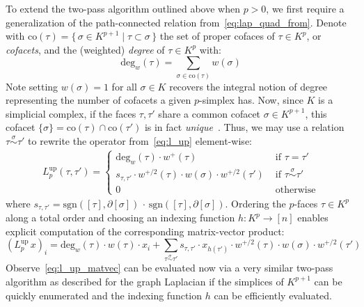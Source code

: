 \documentclass[10pt]{article}
\numberwithin{equation}{section}
\newcommand{\+}{%
	\raisebox{0.18ex}{\scaleobj{0.55}{+}}
}
\theoremstyle{definition}
\theoremstyle{definition}
\begin{document}
To extend the two-pass algorithm outlined above when $p > 0$, we first require a generalization of the path-connected relation from~\eqref{eq:lap_quad_from}.
 Denote with $\mathrm{co}(\tau) = \{ \, \sigma \in K^{p+1} \mid \tau \subset \sigma \, \}$ the set of proper cofaces of $\tau \in K^p$, or \emph{cofacets}, and the (weighted) \emph{degree} of $\tau \in K^p$ with: 
$$\mathrm{deg}_w(\tau) = \sum_{\sigma \in \mathrm{co}(\tau)} w(\sigma) $$
Note setting $w(\sigma) = 1$ for all $\sigma \in K$ recovers the integral notion of degree representing the number of cofacets a given $p$-simplex has. 
Now, since $K$ is a simplicial complex, if the faces $\tau, \tau'$ share a common cofacet $\sigma \in K^{p+1}$, this cofacet $\{\sigma\} = \mathrm{co}(\tau) \cap \mathrm{co}(\tau')$ is in fact \emph{unique}~\cite{goldberg2002combinatorial}. 
Thus, we may use a relation $\tau \overset{\sigma}{\sim} \tau'$ to rewrite the operator from~\eqref{eq:l_up} element-wise: 
\begin{align}\label{eq:up_laplace_theory}
	 L_p^{\text{up}}(\tau, \tau')= \begin{cases}
		 \mathrm{deg}_w(\tau) \cdot w^{+}(\tau) & \text{ if } \tau = \tau' \\ 
		s_{\tau, \tau'} \cdot  w^{+/2}(\tau) \cdot w(\sigma) \cdot w^{+/2}(\tau') & \text{ if } \tau \overset{\sigma}{\sim} \tau' \\
		0 & \text{ otherwise} 
	\end{cases}
\end{align}
where $s_{\tau, \tau'} = \mathrm{sgn}([\tau], \partial[\sigma]) \, \cdot \, \mathrm{sgn}([\tau], \partial[\sigma])$. Ordering the $p$-faces $\tau \in K^p$ along a total order and choosing an indexing function $h : K^p \to [n]$ enables explicit computation of the corresponding matrix-vector product: 
\begin{equation}\label{eq:l_up_matvec}
	(L_p^{\textrm{up}} \, x)_i =  \mathrm{deg}_w(\tau) \cdot w(\tau) \cdot x_i + \sum\limits_{\tau \overset{\sigma}{\sim} \tau'} s_{\tau, \tau'} \cdot x_{h(\tau')} \cdot  w^{+/2}(\tau) \cdot w(\sigma) \cdot w^{+/2}(\tau') 
\end{equation}
Observe~\eqref{eq:l_up_matvec} can be evaluated now via a very similar two-pass algorithm as described for the graph Laplacian if the simplices of $K^{p+1}$ can be quickly enumerated and the indexing function $h$ can be efficiently evaluated.
\end{document}
